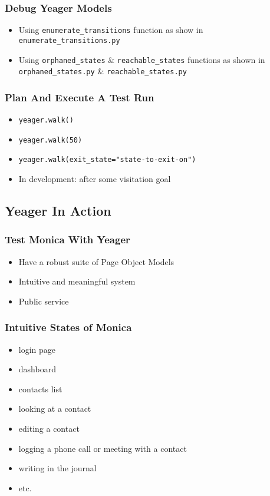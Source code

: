 \begin{frame}
  \frametitle{Debug Yeager Models}
  \begin{itemize}
    \item Using \texttt{enumerate\_transitions} function as show in \texttt{enumerate\_transitions.py} %
    \item Using \texttt{orphaned\_states} \& \texttt{reachable\_states} functions as shown in \texttt{orphaned\_states.py} \& \texttt{reachable\_states.py} %
  \end{itemize}
\end{frame}

\begin{frame}
  \frametitle{Plan And Execute A Test Run}
  \begin{itemize}
    \item \texttt{yeager.walk()}
    \item \texttt{yeager.walk(50)}
    \item \texttt{yeager.walk(exit\_state="state-to-exit-on")}
    \item In development: after some visitation goal
  \end{itemize}
\end{frame}

\subsection{Yeager In Action}

\begin{frame}
  \frametitle{Test Monica With Yeager}
  \begin{itemize}
    \item Have a robust suite of Page Object Models
    \item Intuitive and meaningful system
    \item Public service
  \end{itemize}
\end{frame}

\begin{frame}
  \frametitle{Intuitive States of Monica}
  \begin{itemize}
    \item login page
    \item dashboard
    \item contacts list
    \item looking at a contact
    \item editing a contact
    \item logging a phone call or meeting with a contact
    \item writing in the journal
    \item etc.
  \end{itemize}
\end{frame}

